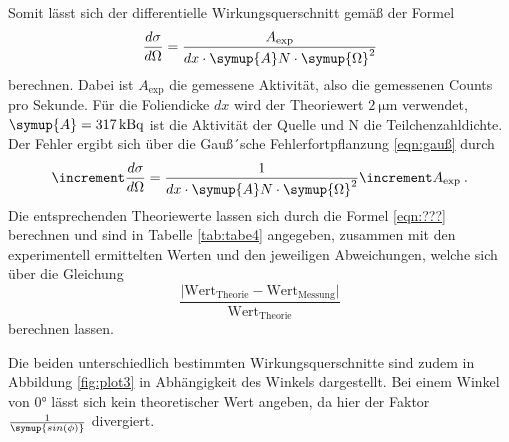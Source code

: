 Somit lässt sich der differentielle Wirkungsquerschnitt gemäß der Formel
\begin{equation}
  \frac{d\sigma}{d\Omega}= \frac{A_{\text{exp}}}{dx\cdot \symup{A} N \cdot \symup{\Omega}^2}
  \label{eqn:Wq}
\end{equation}
berechnen. Dabei ist $A_{\text{exp}}$ die gemessene Aktivität, also die gemessenen Counts
pro Sekunde. Für die Foliendicke $dx$ wird der Theoriewert $\SI{2}{\micro\metre}$ verwendet,
$\symup{A}=\SI{317}{\kilo\becquerel}$ ist die Aktivität der Quelle und N die Teilchenzahldichte.
Der Fehler ergibt sich über die Gauß´sche Fehlerfortpflanzung \ref{eqn:gauß} durch
\begin{equation}
   \increment \frac{d\sigma}{d\Omega}= \frac{1}{dx\cdot \symup{A} N \cdot \symup{\Omega}^2}\increment A_{\text{exp}} \: .
   \label{eqn:dWq}
\end{equation}
Die entsprechenden Theoriewerte lassen sich durch die Formel \ref{eqn:???} berechnen und sind in Tabelle
\ref{tab:tabe4} angegeben, zusammen mit den experimentell ermittelten Werten und den jeweiligen Abweichungen,
welche sich über die Gleichung
\begin{equation}
  \frac{\lvert \text{Wert}_{\text{Theorie}}-\text{Wert}_{\text{Messung}}\rvert}{\text{Wert}_{\text{Theorie}}}
  \label{eqn:abw}
\end{equation}
berechnen lassen.

Die beiden unterschiedlich bestimmten Wirkungsquerschnitte sind zudem in Abbildung \ref{fig:plot3}
in Abhängigkeit des Winkels dargestellt. Bei einem Winkel von 0° lässt sich kein theoretischer Wert angeben,
da hier der Faktor $\frac{1}{\symup{sin(\phi)}}$ divergiert.
